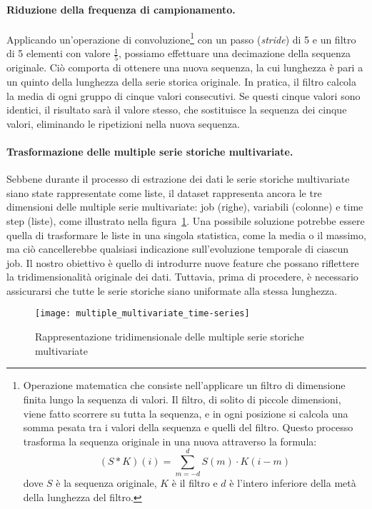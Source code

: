 \paragraph{Riduzione della frequenza di campionamento.} Applicando
un'operazione di convoluzione\footnote{Operazione matematica che consiste
    nell'applicare un filtro di dimensione finita lungo la sequenza di valori.
    Il filtro, di solito di piccole dimensioni, viene fatto scorrere su tutta
    la sequenza, e in ogni posizione si calcola una somma pesata tra i valori
    della sequenza e quelli del filtro. Questo processo trasforma la sequenza
    originale in una nuova attraverso la formula: $$(S\ast
K)(i)=\displaystyle\sum_{m=-d}^{d}S(m)\cdot K(i-m)$$ dove $S$ è la sequenza
originale, $K$ è il filtro e $d$ è l'intero inferiore della metà della
lunghezza del filtro.} con un passo (\textit{stride}) di 5 e un filtro di 5
elementi con valore $\frac{1}{5}$, possiamo effettuare una decimazione della
sequenza originale. Ciò comporta di ottenere una nuova sequenza, la cui
lunghezza è pari a un quinto della lunghezza della serie storica originale. In
pratica, il filtro calcola la media di ogni gruppo di cinque valori
consecutivi. Se questi cinque valori sono identici, il risultato sarà il
valore stesso, che sostituisce la sequenza dei cinque valori, eliminando le
ripetizioni nella nuova sequenza.

\paragraph{Trasformazione delle multiple serie storiche multivariate.} Sebbene
durante il processo di estrazione dei dati le serie storiche multivariate
siano state rappresentate come liste, il dataset rappresenta ancora le tre
dimensioni delle multiple serie multivariate: job (righe), variabili (colonne)
e time step (liste), come illustrato nella
figura~\ref{fig:multiple_multivariate_time-series}. Una possibile soluzione
potrebbe essere quella di trasformare le liste in una singola statistica, come
la media o il massimo, ma ciò cancellerebbe qualsiasi indicazione
sull'evoluzione temporale di ciascun job. Il nostro obiettivo è quello di
introdurre nuove feature che possano riflettere la tridimensionalità originale
dei dati. Tuttavia, prima di procedere, è necessario assicurarsi che tutte le
serie storiche siano uniformate alla stessa lunghezza.

\begin{figure}[!ht]
   \centering
   \texttt{[image: multiple\_multivariate\_time-series]}
   \caption{Rappresentazione tridimensionale delle multiple serie storiche
   multivariate}
   \label{fig:multiple_multivariate_time-series}
\end{figure}

